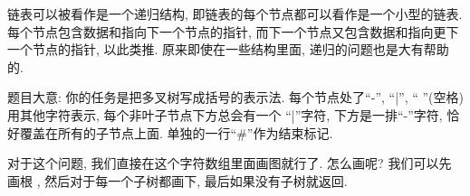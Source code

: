 链表可以被看作是一个递归结构, 即链表的每个节点都可以看作是一个小型的链表. 
每个节点包含数据和指向下一个节点的指针, 而下一个节点又包含数据和指向更下一个节点的指针, 
以此类推. 
原来即使在一些结构里面, 递归的问题也是大有帮助的. 




 题目大意: 你的任务是把多叉树写成括号的表示法. 
每个节点处了``-'', ``|'', `` ''(空格)用其他字符表示, 每个非叶子节点下方总会有一个
``|''字符, 下方是一排``-''字符, 恰好覆盖在所有的子节点上面. 单独的一行``\#''作为结束标记.

对于这个问题, 我们直接在这个字符数组里面画图就行了. 怎么画呢? 我们可以先画根
, 然后对于每一个子树都画下, 最后如果没有子树就返回. 



